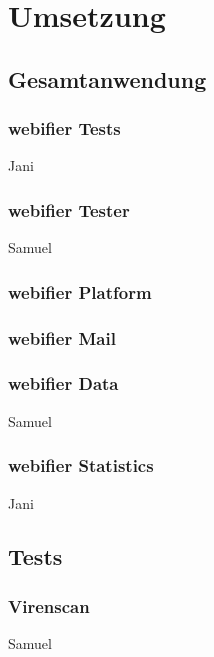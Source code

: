 \chapter{Umsetzung}
\section{Gesamtanwendung}

\subsection{webifier Tests}

\todo Jani

\subsection{webifier Tester}

\todo Samuel

\subsection{webifier Platform}


\subsection{webifier Mail}


\subsection{webifier Data}

\todo Samuel

\subsection{webifier Statistics}

\todo Jani

\section{Tests}

\subsection{Virenscan}

\todo Samuel

